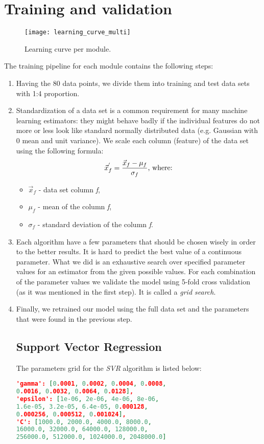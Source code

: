 \section{Training and validation}
\begin{figure*}[!t]
	\centering
	\begin{minipage}{0.85\linewidth}
		\texttt{[image: learning\_curve\_multi]}
	\end{minipage}
	\caption{Learning curve per module.}
	\label{fig:curve}
\end{figure*}

The training pipeline for each module contains the following steps:
\begin{enumerate}
	\item Having the 80 data points, we divide them into training and test data sets with 1:4 proportion.
	\item Standardization of a data set is a common requirement for many machine learning estimators: they might behave badly if the individual features do not more or less look like standard normally distributed data (e.g. Gaussian with 0 mean and unit variance)\cite{scaler}. We scale each column (feature) of the data set using the following formula:
	\[ \vec{x}_{f}^{'} = \frac{\vec{x}_{f}-\mu_f}{\sigma_f} \textnormal{, where:}\]
	\begin{itemize}
		\item $ \vec{x}_{f} $ - data set column \textit{f},
		\item $ \mu_f $ - mean of the column \textit{f},
		\item $ \sigma_f $ - standard deviation of the column \textit{f}.
	\end{itemize}
	\item Each algorithm have a few parameters that should be chosen wisely in order to the better results. It is hard to predict the best value of a continuous parameter. What we did is an exhaustive search over specified parameter values for an estimator from the given possible values. For each combination of the parameter values we validate the model using 5-fold cross validation (as it was mentioned in the first step). It is called a \textit{grid search}\cite{grid_search}.
	\item Finally, we retrained our model using the full data set and the parameters that were found in the previous step.
	\subsection{Support Vector Regression}
	The parameters grid for the \textit{SVR} algorithm is listed below:
	\begin{lstlisting}[language=json,firstnumber=1]
'gamma': [0.0001, 0.0002, 0.0004, 0.0008, 
0.0016, 0.0032, 0.0064, 0.0128], 
'epsilon': [1e-06, 2e-06, 4e-06, 8e-06, 
1.6e-05, 3.2e-05, 6.4e-05, 0.000128, 
0.000256, 0.000512, 0.001024], 
'C': [1000.0, 2000.0, 4000.0, 8000.0,
16000.0, 32000.0, 64000.0, 128000.0, 
256000.0, 512000.0, 1024000.0, 2048000.0]
	\end{lstlisting}
	

\end{enumerate}
